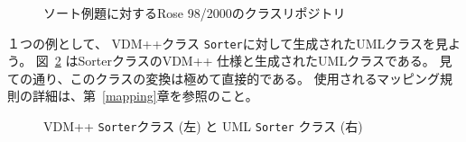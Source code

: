 \documentclass[\pformat,12pt]{jarticle}
\newcommand{\vdmpp}{VDM++}
\newcommand{\rose}{Rose 98/2000}
\begin{document}
\begin{figure}[htb]
\begin{center}
\mbox{}
\caption{ソート例題に対する\rose{}のクラスリポジトリ　\label{fig:classrepository}}
\end{center}
\end{figure}

１つの例として、 \vdmpp{}クラス {\tt Sorter}に対して生成されたUMLクラスを見よう。
図~\ref{fig:SorterVDMUML} はSorterクラスの\vdmpp{} 仕様と生成されたUMLクラスである。
見ての通り、このクラスの変換は極めて直接的である。
使用されるマッピング規則の詳細は、第~\ref{mapping}章を参照のこと。


\begin{figure}[htb]
\begin{center}
\hspace{-1.5cm}
\hspace{0.2cm}
\caption{\vdmpp{} {\tt Sorter}クラス (左) と UML {\tt Sorter} クラス (右)　\label{fig:SorterVDMUML}}
\end{center}
\end{figure}
\end{document}
